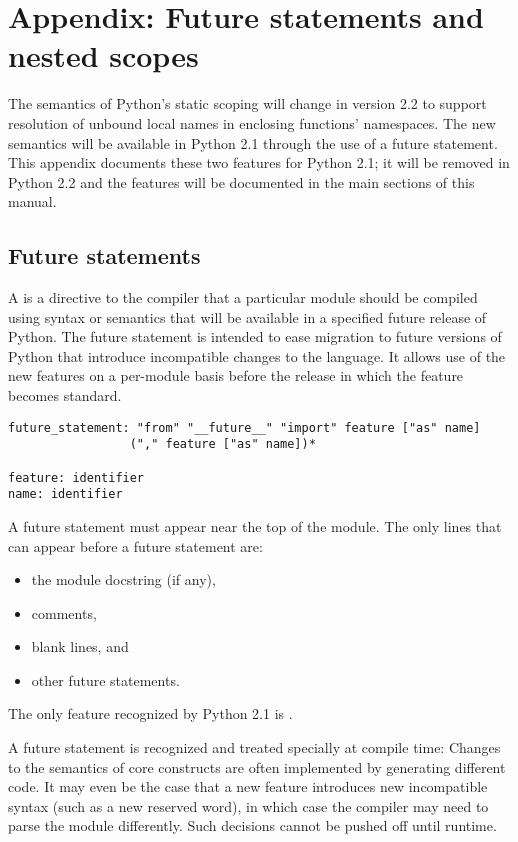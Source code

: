 \chapter{Appendix: Future statements and nested scopes}

The semantics of Python's static scoping will change in version 2.2 to
support resolution of unbound local names in enclosing functions'
namespaces.  The new semantics will be available in Python 2.1 through
the use of a future statement.  This appendix documents these two
features for Python 2.1; it will be removed in Python 2.2 and the
features will be documented in the main sections of this manual.

\section{Future statements}

A  is a directive to the compiler that a
particular module should be compiled using syntax or semantics that
will be available in a specified future release of Python.  The future
statement is intended to ease migration to future versions of Python
that introduce incompatible changes to the language.  It allows use of
the new features on a per-module basis before the release in which the
feature becomes standard.

\begin{verbatim}
future_statement: "from" "__future__" "import" feature ["as" name]
                 ("," feature ["as" name])*

feature: identifier
name: identifier
\end{verbatim}

A future statement must appear near the top of the module.  The only
lines that can appear before a future statement are:

\begin{itemize}

\item the module docstring (if any),
\item comments,
\item blank lines, and
\item other future statements.

\end{itemize}

The only feature recognized by Python 2.1 is .

A future statement is recognized and treated specially at compile time:
Changes to the semantics of core constructs are often implemented by
generating different code.  It may even be the case that a new feature
introduces new incompatible syntax (such as a new reserved word), in
which case the compiler may need to parse the module differently.  Such
decisions cannot be pushed off until runtime.

